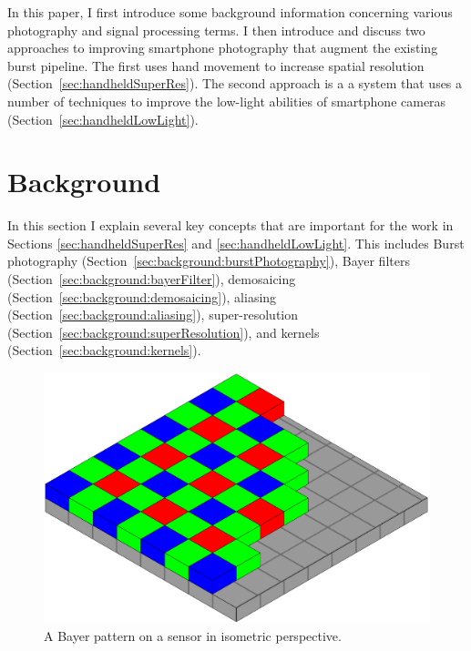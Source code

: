 \documentclass{sig-alternate}
\begin{document}
In this paper, I first introduce some background information concerning various photography and signal processing terms. I then introduce and discuss two approaches to improving smartphone photography that augment the existing burst pipeline. The first uses hand movement to increase spatial resolution (Section~\ref{sec:handheldSuperRes}). The second approach is a a system that uses a number of techniques to improve the low-light abilities of smartphone cameras (Section~\ref{sec:handheldLowLight}).

\section{Background}
\label{sec:background}

In this section I explain several key concepts that are important for the work in Sections \ref{sec:handheldSuperRes} and \ref{sec:handheldLowLight}. This includes Burst photography (Section~\ref{sec:background:burstPhotography}), Bayer filters (Section~\ref{sec:background:bayerFilter}), demosaicing (Section~\ref{sec:background:demosaicing}), aliasing (Section~\ref{sec:background:aliasing}), super-resolution (Section~\ref{sec:background:superResolution}), and kernels (Section~\ref{sec:background:kernels}).

\begin{figure}
\centering
\includegraphics[width=\columnwidth]{Bayer_pattern_on_sensor}
\caption{A Bayer pattern on a sensor in isometric perspective.~\cite{wiki:BayerFilter}}
\label{fig:BayerPattern}
\end{figure}
\end{document}
